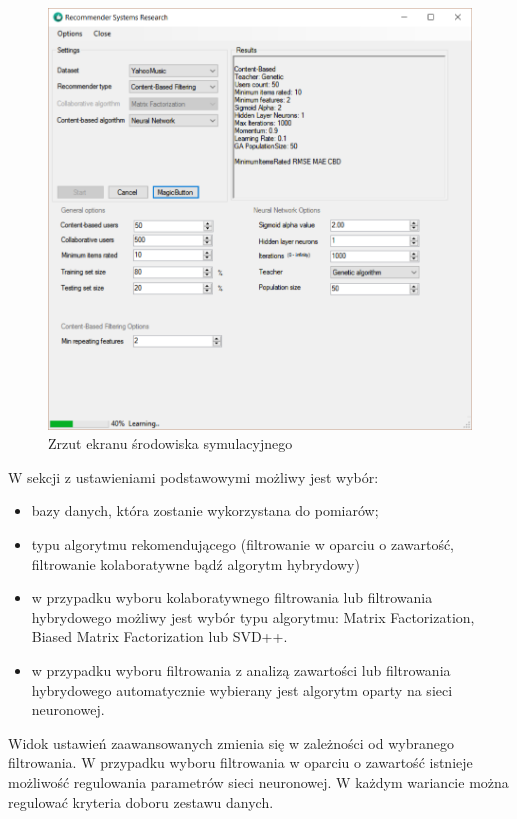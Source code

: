 \documentclass[twoside]{iisthesis}
\begin{document}
		\begin{figure}[!ht] 
			\centering
			\includegraphics[width=1\textwidth]{program}
			\caption{Zrzut ekranu środowiska symulacyjnego}
			\label{fig:program}
		\end{figure}
	
		W sekcji z ustawieniami podstawowymi możliwy jest wybór:
		\begin{itemize}
			\item bazy danych, która zostanie wykorzystana do pomiarów;
			\item typu algorytmu rekomendującego (filtrowanie w oparciu o zawartość, filtrowanie kolaboratywne bądź algorytm hybrydowy)
			\item w przypadku wyboru kolaboratywnego filtrowania lub filtrowania hybrydowego możliwy jest wybór typu algorytmu: Matrix Factorization, Biased Matrix Factorization lub SVD++.
			\item w przypadku wyboru filtrowania z analizą zawartości lub filtrowania hybrydowego automatycznie wybierany jest algorytm oparty na sieci neuronowej. 
		\end{itemize}
		 
		 Widok ustawień zaawansowanych zmienia się w zależności od wybranego filtrowania. W przypadku wyboru filtrowania w oparciu o zawartość istnieje możliwość regulowania parametrów sieci neuronowej. W każdym wariancie można regulować kryteria doboru zestawu danych.
		 
\end{document}
